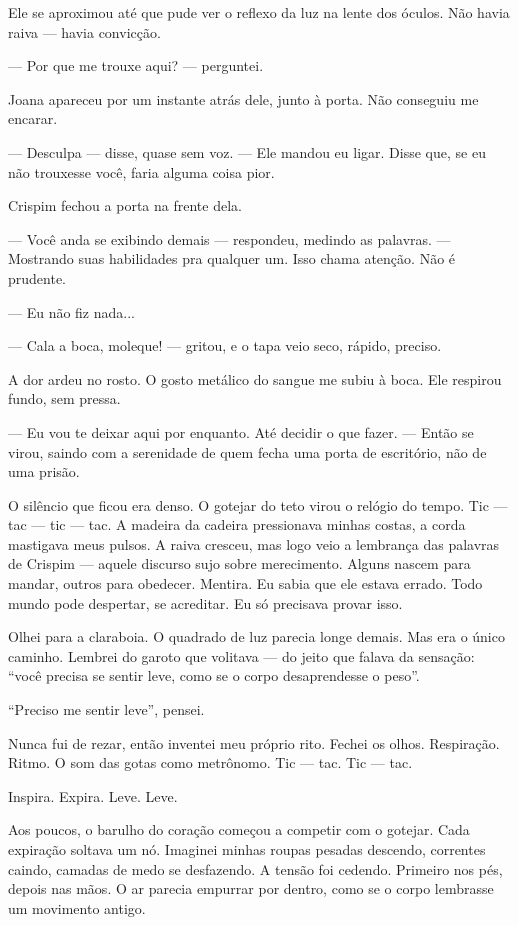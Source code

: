 Ele se aproximou até que pude ver o reflexo da luz na lente dos óculos. Não havia raiva — havia convicção.

— Por que me trouxe aqui? — perguntei.

Joana apareceu por um instante atrás dele, junto à porta. Não conseguiu me encarar.

— Desculpa — disse, quase sem voz. — Ele mandou eu ligar. Disse que, se eu não trouxesse você, faria alguma coisa pior.

Crispim fechou a porta na frente dela.

— Você anda se exibindo demais — respondeu, medindo as palavras. — Mostrando suas habilidades pra qualquer um. Isso chama atenção. Não é prudente.

— Eu não fiz nada...

— Cala a boca, moleque! — gritou, e o tapa veio seco, rápido, preciso.

A dor ardeu no rosto. O gosto metálico do sangue me subiu à boca.  
Ele respirou fundo, sem pressa.

— Eu vou te deixar aqui por enquanto. Até decidir o que fazer. — Então se virou, saindo com a serenidade de quem fecha uma porta de escritório, não de uma prisão.

O silêncio que ficou era denso.  
O gotejar do teto virou o relógio do tempo. Tic — tac — tic — tac.  
A madeira da cadeira pressionava minhas costas, a corda mastigava meus pulsos.  
A raiva cresceu, mas logo veio a lembrança das palavras de Crispim — aquele discurso sujo sobre merecimento. Alguns nascem para mandar, outros para obedecer.  
Mentira.  
Eu sabia que ele estava errado. Todo mundo pode despertar, se acreditar. Eu só precisava provar isso.

Olhei para a claraboia. O quadrado de luz parecia longe demais. Mas era o único caminho.  
Lembrei do garoto que volitava — do jeito que falava da sensação: “você precisa se sentir leve, como se o corpo desaprendesse o peso”.

“Preciso me sentir leve”, pensei.

Nunca fui de rezar, então inventei meu próprio rito. Fechei os olhos.  
Respiração. Ritmo.  
O som das gotas como metrônomo. Tic — tac. Tic — tac.

Inspira.  
Expira.  
Leve.  
Leve.

Aos poucos, o barulho do coração começou a competir com o gotejar. Cada expiração soltava um nó. Imaginei minhas roupas pesadas descendo, correntes caindo, camadas de medo se desfazendo.  
A tensão foi cedendo.  
Primeiro nos pés, depois nas mãos. O ar parecia empurrar por dentro, como se o corpo lembrasse um movimento antigo.

